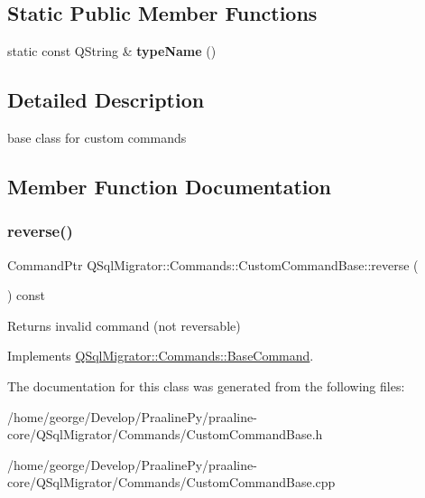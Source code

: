 \subsection*{Static Public Member Functions}
\begin{DoxyCompactItemize}
\item 
\mbox{\label{class_q_sql_migrator_1_1_commands_1_1_custom_command_base_adf2a577597d5d397ed15c95357aa1459}} 
static const Q\+String \& {\bfseries type\+Name} ()
\end{DoxyCompactItemize}


\subsection{Detailed Description}
base class for custom commands 

\subsection{Member Function Documentation}
\mbox{\label{class_q_sql_migrator_1_1_commands_1_1_custom_command_base_a40c94f9cd360848f2c1c80b05a86ad08}} 
\subsubsection{\texorpdfstring{reverse()}{reverse()}}
{\footnotesize\ttfamily Command\+Ptr Q\+Sql\+Migrator\+::\+Commands\+::\+Custom\+Command\+Base\+::reverse (\begin{DoxyParamCaption}{ }\end{DoxyParamCaption}) const\hspace{0.3cm}{\ttfamily [virtual]}}

\begin{DoxyReturn}{Returns}
invalid command (not reversable) 
\end{DoxyReturn}


Implements \hyperlink{class_q_sql_migrator_1_1_commands_1_1_base_command}{Q\+Sql\+Migrator\+::\+Commands\+::\+Base\+Command}.



The documentation for this class was generated from the following files\+:\begin{DoxyCompactItemize}
\item 
/home/george/\+Develop/\+Praaline\+Py/praaline-\/core/\+Q\+Sql\+Migrator/\+Commands/Custom\+Command\+Base.\+h\item 
/home/george/\+Develop/\+Praaline\+Py/praaline-\/core/\+Q\+Sql\+Migrator/\+Commands/Custom\+Command\+Base.\+cpp\end{DoxyCompactItemize}
